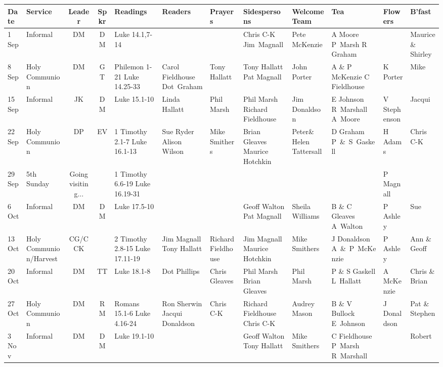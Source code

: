 \documentclass[10pt]{article}
\begin{document}
\begin{center}
{\begin{tabular}{|%
p{}| %
p{}| %
c| %
c| %
X{}| %
X{}| %
p{}| %
X{}| %
X{}| %
X{}| %
p{}| %
p{}|}\hline %
 Date & Service & Leader & Spkr & Readings & Readers & Prayers &
Sidespersons & Welcome Team & Tea &  Flowers & B'fast   \\ \hline %
\hline
\toprule
1 Sep & Informal & DM & DM & Luke 14.1,7-14 &   &   & Chris C-K Jim~Magnall & Pete McKenzie & A Moore P~Marsh R Graham &   & Maurice \& Shirley \\ \hline
8 Sep & Holy Communion & DM & GT & Philemon 1-21 Luke 14.25-33 & Carol Fieldhouse Dot~Graham & Tony Hallatt & Tony Hallatt Pat Magnall & John Porter & A \& P McKenzie C Fieldhouse & K Porter & Mike \\ \hline
15 Sep & Informal & JK  & DM & Luke 15.1-10  & Linda Hallatt & Phil Marsh & Phil Marsh  Richard Fieldhouse & Jim Donaldson & E Johnson  R~Marshall A~Moore   & V Stephenson & Jacqui \\ \hline
22 Sep & Holy Communion & DP & EV & 1 Timothy 2.1-7 Luke 16.1-13  & Sue Ryder Alison Wilson & Mike Smithers & Brian Gleaves Maurice Hotchkin  & Peter\& Helen Tattersall &  D Graham P~\&~S~Gaskell   & H Adams & Chris C-K \\ \hline
29 Sep & 5th Sunday & Going visiting... &   & 1 Timothy 6.6-19 Luke 16.19-31  &  &   &  &  &  & P Magnall &    \\ \hline
6 Oct & Informal & DM & DM & Luke 17.5-10  &  &   & Geoff Walton Pat Magnall & Sheila Williams & B \& C Gleaves A~Walton & P Ashley & Sue  \\ \hline
13 Oct & Holy Communion/Harvest & CG/CCK &   & 2 Timothy 2.8-15 Luke 17.11-19  & Jim Magnall Tony Hallatt & Richard Fieldhouse & Jim Magnall Maurice Hotchkin & Mike Smithers  & J Donaldson  A~\&~P~McKenzie  & P Ashley & Ann \& Geoff \\ \hline
20 Oct & Informal & DM & TT & Luke 18.1-8  & Dot Phillips & Chris Gleaves & Phil Marsh Brian Gleaves & Phil Marsh & P \& S Gaskell L~Hallatt & A McKenzie & Chris \& Brian \\ \hline
27 Oct & Holy Communion & DM & RM & Romans 15.1-6 Luke 4.16-24  & Ron Sherwin Jacqui Donaldson & Chris C-K & Richard Fieldhouse Chris C-K & Audrey Mason & B \& V Bullock E~Johnson & J Donaldson & Pat \& Stephen \\ \hline
3 Nov & Informal & DM & DM & Luke 19.1-10 &  &  & Geoff Walton Tony Hallatt & Mike Smithers  & C Fieldhouse  P~Marsh R~Marshall &  & Robert \\ \hline
\end{tabular}

}
\end{center}
\end{document}
